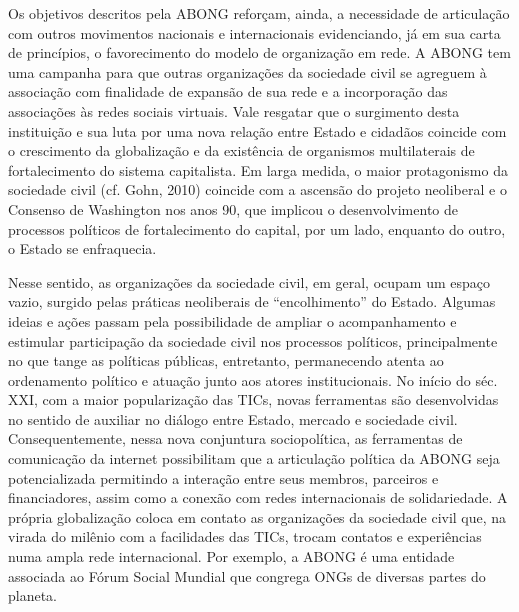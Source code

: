 Os objetivos descritos pela ABONG reforçam, ainda, a necessidade de
articulação com outros movimentos nacionais e internacionais
evidenciando, já em sua carta de princípios, o favorecimento do modelo
de organização em rede. A ABONG tem uma campanha para que outras
organizações da sociedade civil se agreguem à associação com finalidade
de expansão de sua rede e a incorporação das associações às redes
sociais virtuais. Vale resgatar que o surgimento desta instituição e sua
luta por uma nova relação entre Estado e cidadãos coincide com o
crescimento da globalização e da existência de organismos multilaterais
de fortalecimento do sistema capitalista. Em larga medida, o maior
protagonismo da sociedade civil (cf. Gohn, 2010) coincide com a ascensão
do projeto neoliberal e o Consenso de Washington nos anos 90, que
implicou o desenvolvimento de processos políticos de fortalecimento do
capital, por um lado, enquanto do outro, o Estado se enfraquecia.

Nesse sentido, as organizações da sociedade civil, em geral, ocupam um
espaço vazio, surgido pelas práticas neoliberais de ``encolhimento'' do
Estado. Algumas ideias e ações passam pela possibilidade de ampliar o
acompanhamento e estimular participação da sociedade civil nos processos
políticos, principalmente no que tange as políticas públicas,
entretanto, permanecendo atenta ao ordenamento político e atuação junto
aos atores institucionais. No início do séc. XXI, com a maior
popularização das TICs, novas ferramentas são desenvolvidas no sentido
de auxiliar no diálogo entre Estado, mercado e sociedade civil.
Consequentemente, nessa nova conjuntura sociopolítica, as ferramentas de
comunicação da internet possibilitam que a articulação política da ABONG
seja potencializada permitindo a interação entre seus membros, parceiros
e financiadores, assim como a conexão com redes internacionais de
solidariedade. A própria globalização coloca em contato as organizações
da sociedade civil que, na virada do milênio com a facilidades das TICs,
trocam contatos e experiências numa ampla rede internacional. Por
exemplo, a ABONG é uma entidade associada ao Fórum Social Mundial que
congrega ONGs de diversas partes do planeta.


